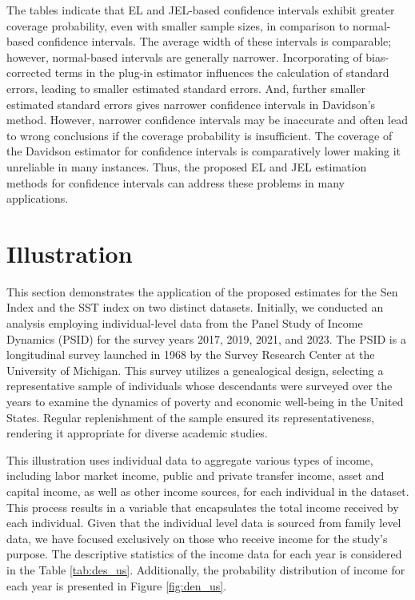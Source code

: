 \documentclass[11pt]{article}
\begin{document}
The tables indicate that EL and JEL-based confidence intervals exhibit greater coverage probability, even with smaller sample sizes, in comparison to normal-based confidence intervals. The average width of these intervals is comparable; however, normal-based intervals are generally narrower. Incorporating of bias-corrected terms in the plug-in estimator influences the calculation of standard errors, leading to smaller estimated standard errors. And, further smaller estimated standard errors gives narrower confidence intervals in Davidson's method. However, narrower confidence intervals may be inaccurate and often lead to wrong conclusions if the coverage probability is insufficient. The coverage of the Davidson estimator for confidence intervals is comparatively lower making it unreliable in many instances. Thus, the proposed EL and JEL estimation methods for confidence intervals can address these problems in many applications.




\section{Illustration}

This section demonstrates the application of the proposed estimates for the Sen Index and the SST index on two distinct datasets. Initially, we conducted an analysis employing individual-level data from the Panel Study of Income Dynamics (PSID) for the survey years 2017, 2019, 2021, and 2023. The PSID is a longitudinal survey launched in 1968 by the Survey Research Center at the University of Michigan. This survey utilizes a genealogical design, selecting a representative sample of individuals whose descendants were surveyed over the years to examine the dynamics of poverty and economic well-being in the United States. Regular replenishment of the sample ensured its representativeness, rendering it appropriate for diverse academic studies.

This illustration uses individual data to aggregate various types of income, including labor market income, public and private transfer income, asset and capital income, as well as other income sources, for each individual in the dataset. This process results in a variable that encapsulates the total income received by each individual. Given that the individual level data is sourced from family level data, we have focused exclusively on those who receive income for the study's purpose.   The descriptive statistics of the income data for each year is considered in the Table \ref{tab:des_us}. Additionally, the probability distribution of income for each year is presented in Figure \ref{fig:den_us}.
\end{document}
